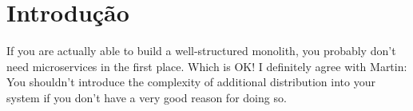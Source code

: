 \chapter[Introdução]{Introdução}




If you are actually able to build a well-structured monolith, you probably don’t need microservices in the first place. Which is OK! I definitely agree with Martin: You shouldn’t introduce the complexity of additional distribution into your system if you don’t have a very good reason for doing so.

%
%
%
%

